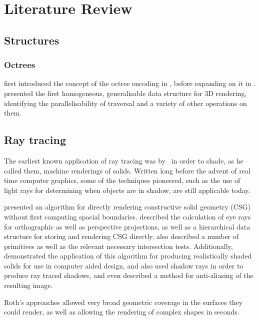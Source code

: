 \chapter{Literature Review}
\label{litreview}

\section{Structures}

\subsection{Octrees}
\citeauthor{meagher80octree} first introduced the concept of the octree encoding in \cite{meagher80octree}, before expanding on it in \cite{meagher81octree}. \citeauthor{meagher81octree} presented the first homogeneous, generalisable data structure for 3D rendering, identifying the parallelisability of traversal and a variety of other operations on them.

\section{Ray tracing}
The earliest known application of ray tracing was by~\cite{appel68raytracing} in order to shade, as he called them, machine renderings of solids. Written long before the advent of real time computer graphics, some of the techniques \citeauthor{appel68raytracing}  pioneered, such as the use of light rays for determining when objects are in shadow, are still applicable today.

\cite{roth82roughimprove} presented an algorithm for directly rendering constructive solid geometry (CSG) without first computing spacial boundaries. \citeauthor{roth82roughimprove} described the calculation of eye rays for orthographic as well as perspective projections, as well as a hierarchical data structure for storing and rendering CSG directly. \citeauthor{roth82roughimprove} also described a number of primitives as well as the relevant necessary intersection tests. Additionally, \citeauthor{roth82roughimprove} demonstrated the application of this algorithm for producing realistically shaded solids for use in computer aided design, and also used shadow rays in order to produce ray traced shadows, and even described a method for anti-aliasing of the resulting image.

Roth's approaches allowed very broad geometric coverage in the surfaces they could render, as well as allowing the rendering of complex shapes in seconds.

